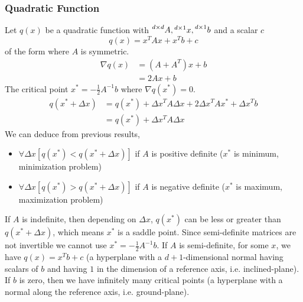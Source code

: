 \documentclass{article}
\numberwithin{equation}{subsection}
\begin{document}
\subsubsection{Quadratic Function}
Let $q(x)$ be a quadratic function with $\prescript{d \times d}{}{A}, \prescript{d \times 1}{}{x}, \prescript{d \times 1}{}{b}$ and a scalar $c$
\begin{equation}
    q(x) = x^TAx+x^Tb+c
\end{equation}
of the form where $A$ is symmetric.
\begin{align}
    \nabla q(x) &= (A+A^T)x+b\\
     &= 2Ax+b
\end{align}
The critical point $x^* = -\frac{1}{2}A^{-1}b$ where $\nabla q(x^*) = 0$.
\begin{align}
    q(x^*+\Delta x) &= q(x^*) + \Delta x^TA\Delta x + 2\Delta x^TAx^* + \Delta x^Tb\\
    &= q(x^*) + \Delta x^TA\Delta x
\end{align}
We can deduce from previous results, 
\begin{itemize}
    \item $\forall \Delta x [q(x^*) < q(x^*+\Delta x)]$ if $A$ is positive definite ($x^*$ is minimum, minimization problem)
    \item $\forall \Delta x [q(x^*) > q(x^*+\Delta x)]$ if $A$ is negative definite ($x^*$ is maximum, maximization problem)
    \label{posneg}
\end{itemize}
If $A$ is indefinite, then depending on $\Delta x$, $q(x^*)$ can be less or greater than $q(x^*+\Delta x)$, which means $x^*$ is a saddle point. Since semi-definite matrices are not invertible we cannot use $x^* = -\frac{1}{2}A^{-1}b$. If $A$ is semi-definite, for some $x$, we have $q(x) = x^Tb+c$ (a hyperplane with a $d+1$-dimensional normal having scalars of $b$ and having $1$ in the dimension of a reference axis, i.e. inclined-plane). If $b$ is zero, then we have infinitely many critical points (a hyperplane with a normal along the reference axis, i.e. ground-plane).
\end{document}
